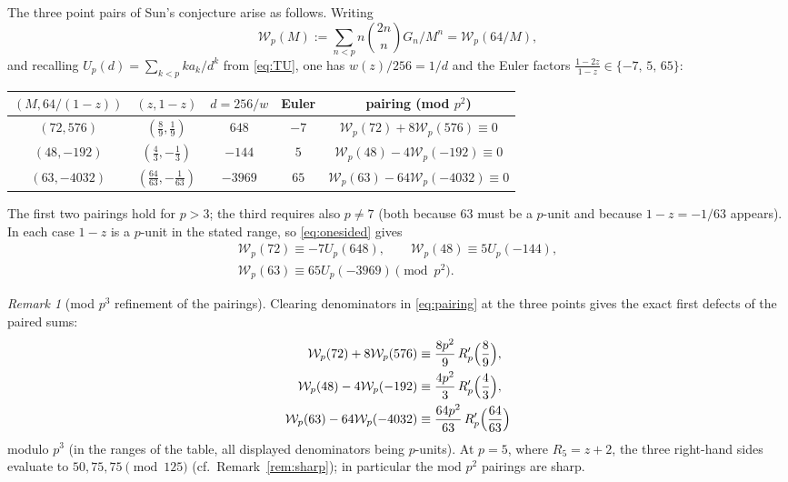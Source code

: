 \documentclass[11pt]{amsart}
\theoremstyle{definition}
\theoremstyle{remark}
\newtheorem{remark}[theorem]{Remark}
\begin{document}
The three point pairs of Sun's conjecture arise as follows. Writing
\[
\mathcal W_p(M):=\sum_{n<p}n\binom{2n}{n}G_n\big/M^n=\mathcal W_p(64/M),
\]
and recalling $U_p(d)=\sum_{k<p}ka_k/d^k$ from \eqref{eq:TU}, one has
$w(z)/256=1/d$ and the Euler factors
$\frac{1-2z}{1-z}\in\{-7,\,5,\,65\}$:

\begin{center}
\footnotesize
\begin{tabular}{ccccc}
\toprule
$(M,64/(1-z))$ & $(z,1-z)$ & $d=256/w$ & Euler
& pairing (mod $p^2$)\\
\midrule
$(72,576)$ & $(\frac89,\frac19)$ & $648$ & $-7$ &
$\mathcal W_p(72)+8\mathcal W_p(576)\equiv0$\\
$(48,-192)$ & $(\frac43,-\frac13)$ & $-144$ & $5$ &
$\mathcal W_p(48)-4\mathcal W_p(-192)\equiv0$\\
$(63,-4032)$ & $(\frac{64}{63},-\frac1{63})$ & $-3969$ & $65$ &
$\mathcal W_p(63)-64\mathcal W_p(-4032)\equiv0$\\
\bottomrule
\end{tabular}
\end{center}

The first two pairings hold for $p>3$; the third requires also $p\ne7$
(both because $63$ must be a $p$-unit and because $1-z=-1/63$ appears).
In each case $1-z$ is a $p$-unit in the stated range, so
\eqref{eq:onesided} gives
\begin{equation}\label{eq:eulertrans}
\begin{gathered}
\mathcal W_p(72)\equiv-7U_p(648),\qquad
\mathcal W_p(48)\equiv5U_p(-144),\\
\mathcal W_p(63)\equiv65U_p(-3969)\pmod{p^2}.
\end{gathered}
\end{equation}

\begin{remark}[mod $p^3$ refinement of the pairings]\label{rem:pairdefect}
Clearing denominators in \eqref{eq:pairing} at the three points gives
the exact first defects of the paired sums:
\begin{align*}
\mathcal W_p(72)+8\mathcal W_p(576)
&\equiv \frac{8p^2}{9}\,R_p'\Bigl(\frac89\Bigr),\\
\mathcal W_p(48)-4\mathcal W_p(-192)
&\equiv \frac{4p^2}{3}\,R_p'\Bigl(\frac43\Bigr),\\
\mathcal W_p(63)-64\mathcal W_p(-4032)
&\equiv \frac{64p^2}{63}\,R_p'\Bigl(\frac{64}{63}\Bigr)
\end{align*}
modulo $p^3$ (in the ranges of the table, all displayed denominators
being $p$-units). At $p=5$, where $R_5=z+2$, the three right-hand
sides evaluate to $50,75,75\pmod{125}$ (cf.\ Remark~\ref{rem:sharp});
in particular the mod $p^2$ pairings are sharp.
\end{remark}
\end{document}
